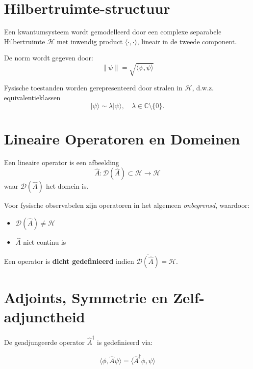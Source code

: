 \documentclass{report} %
\begin{document}
    \section{Hilbertruimte-structuur}

    Een kwantumsysteem wordt gemodelleerd door een complexe separabele Hilbertruimte
    $\mathcal{H}$ met inwendig product
    $\langle \cdot , \cdot \rangle$, lineair in de tweede component.

    De norm wordt gegeven door:
    \begin{equation}
        \|\psi\| = \sqrt{\langle \psi,\psi \rangle}
    \end{equation}

    Fysische toestanden worden gerepresenteerd door stralen in $\mathcal{H}$,
    d.w.z. equivalentieklassen
    \[
        |\psi\rangle \sim \lambda |\psi\rangle,
        \quad \lambda \in \mathbb{C}\setminus\{0\}.
    \]


    \section{Lineaire Operatoren en Domeinen}

    Een lineaire operator is een afbeelding
    \[
        \hat{A} : \mathcal{D}(\hat{A}) \subset \mathcal{H}
        \to \mathcal{H}
    \]
    waar $\mathcal{D}(\hat{A})$ het domein is.

    Voor fysische observabelen zijn operatoren in het algemeen
    \emph{onbegrensd}, waardoor:

    \begin{itemize}
        \item $\mathcal{D}(\hat{A}) \neq \mathcal{H}$
        \item $\hat{A}$ niet continu is
    \end{itemize}

    Een operator is \textbf{dicht gedefinieerd} indien
    $\overline{\mathcal{D}(\hat{A})} = \mathcal{H}$.


    \section{Adjoints, Symmetrie en Zelf-adjunctheid}

    De geadjungeerde operator $\hat{A}^\dagger$ is gedefinieerd via:

    \begin{equation}
        \langle \phi, \hat{A}\psi \rangle
        =
        \langle \hat{A}^\dagger \phi, \psi \rangle
    \end{equation}
\end{document}
